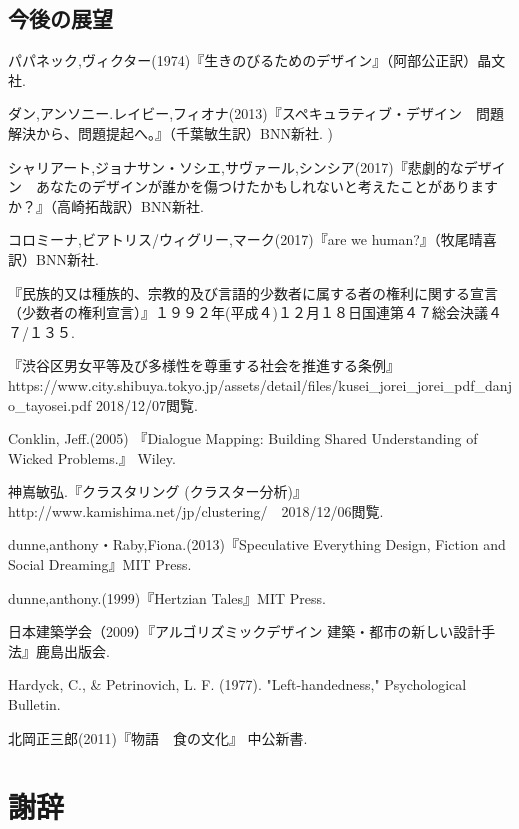 \documentclass{jsarticle}
\begin{document}
\subsection{今後の展望}

\newpage
\begin{thebibliography}{99}

  パパネック,ヴィクター(1974)『生きのびるためのデザイン』（阿部公正訳）晶文社.

  ダン,アンソニー.レイビー,フィオナ(2013)『スペキュラティブ・デザイン　問題解決から、問題提起へ。』（千葉敏生訳）BNN新社.
  )

  シャリアート,ジョナサン・ソシエ,サヴァール,シンシア(2017)『悲劇的なデザイン　あなたのデザインが誰かを傷つけたかもしれないと考えたことがありますか？』（高崎拓哉訳）BNN新社.

  コロミーナ,ビアトリス/ウィグリー,マーク(2017)『are we human?』（牧尾晴喜訳）BNN新社.

  『民族的又は種族的、宗教的及び言語的少数者に属する者の権利に関する宣言（少数者の権利宣言）』１９９２年(平成４)１２月１８日国連第４７総会決議４７/１３５.

  『渋谷区男女平等及び多様性を尊重する社会を推進する条例』
  https://www.city.shibuya.tokyo.jp/assets/detail/files/kusei\_jorei\_jorei\_pdf\_danjo\_tayosei.pdf
2018/12/07閲覧.

  Conklin, Jeff.(2005) 『Dialogue Mapping: Building Shared Understanding of Wicked Problems.』 Wiley.


  神嶌敏弘.『クラスタリング (クラスター分析)』 http://www.kamishima.net/jp/clustering/　2018/12/06閲覧.


  dunne,anthony・Raby,Fiona.(2013)『Speculative Everything Design, Fiction and Social Dreaming』MIT Press.

  dunne,anthony.(1999)『Hertzian Tales』MIT Press.

  日本建築学会（2009）『アルゴリズミックデザイン 建築・都市の新しい設計手法』鹿島出版会.

  Hardyck, C., & Petrinovich, L. F. (1977). "Left-handedness," Psychological Bulletin.

  北岡正三郎(2011)『物語　食の文化』 中公新書.

\end{thebibliography}

\newpage
\section*{謝辞}
\end{document}
